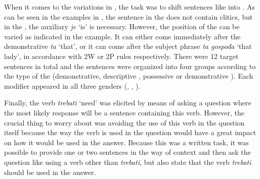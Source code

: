 \documentclass[output=paper,modfonts,newtxmath,hidelinks,]{langscibook}
\begin{document}
\z

\noindent When it comes to the variations in , the task was to shift sentences like  into  . As can be seen in the examples in , the sentence in the  does not contain clitics, but in the , the auxiliary  \textit{je} `is' is necessary. However, the position of the  can be varied as indicated in the example. It can either come immediately after the demonstrative \textit{ta} `that’, or it can come after the subject  phrase \textit{ta gospođa} `that lady', in accordance with 2W or 2P rules respectively. There were 12 target sentences in total and the sentences were organized into four groups according to the type of the  (demonstrative, descriptive , possessive or demonstrative ). Each modifier appeared in all three genders (, , ).

\ea \label{7:ex6}
	\z
\z

\noindent Finally, the verb \textit{trebati} `need' was elicited by means of asking a question where the most likely response will be a sentence containing this verb. However, the crucial thing to worry about was avoiding the use of this verb in the question itself because the way the verb is used in the question would have a great impact on how it would be used in the answer. Because this was a written task, it was possible to provide one or two sentences in the way of context and then ask the question like  using a verb other than \textit{trebati}, but also state that the verb \textit{trebati} should be used in the answer. 
\end{document}
